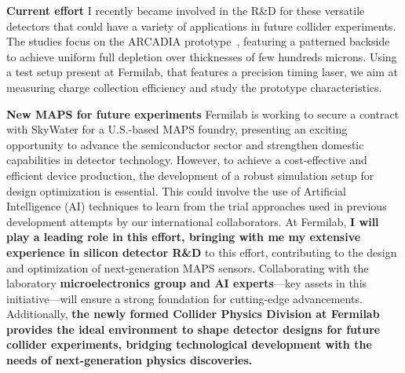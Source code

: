 {\begin{flushleft}
\textbf{Current effort}
I recently became involved in the R\&D for these versatile detectors that could have a variety of applications in future collider experiments. The studies focus on the ARCADIA prototype~\cite{[8]}, featuring a patterned backside to achieve uniform full depletion over thicknesses of few hundreds microns. Using a test setup present at Fermilab, that features a precision timing laser, we aim at measuring charge collection efficiency and study the prototype characteristics.

\textbf{New MAPS for future experiments}
Fermilab is working to secure a contract with SkyWater for a U.S.-based MAPS foundry, presenting an exciting opportunity to advance the semiconductor sector and strengthen domestic capabilities in detector technology. However, to achieve a cost-effective and efficient device production, the development of a robust simulation setup for design optimization is essential. This could involve the use of Artificial Intelligence (AI) techniques to learn from the trial approaches used in previous development attempts by our international collaborators. %
At Fermilab, {\bf I will play a leading role in this effort, bringing with me my extensive experience in silicon detector R\&D} to this effort, contributing to the design and optimization of next-generation MAPS sensors. Collaborating with the laboratory {\bf microelectronics group and AI experts}—key assets in this initiative—will ensure a strong foundation for cutting-edge advancements. Additionally, \textbf{the newly formed Collider Physics Division at Fermilab provides the ideal environment to shape detector designs for future collider experiments, bridging technological development with the needs of next-generation physics discoveries.}


 



\end{flushleft}}

